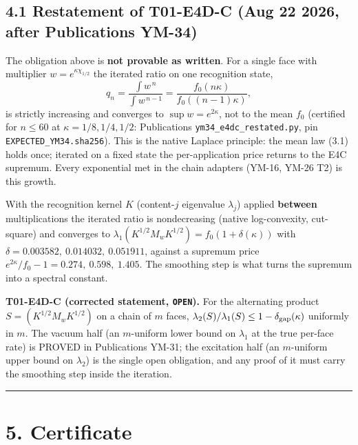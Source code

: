 \hypertarget{restatement-of-t01-e4d-c-aug-22-2026-after-publications-ym-34}{%
\subsection{4.1 Restatement of T01-E4D-C (Aug 22 2026, after Publications YM-34)}\label{restatement-of-t01-e4d-c-aug-22-2026-after-publications-ym-34}}

The obligation above is \textbf{not provable as written}. For a single face with
multiplier \(w=e^{\kappa\chi_{1/2}}\) the iterated ratio on one recognition
state,
\[
q_n=\frac{\int w^{\,n}}{\int w^{\,n-1}}=\frac{f_0(n\kappa)}{f_0((n-1)\kappa)},
\]
is strictly increasing and converges to \(\sup w=e^{2\kappa}\), not to the mean
\(f_0\) (certified for \(n\le 60\) at \(\kappa=1/8,1/4,1/2\): Publications
\texttt{ym34\_e4dc\_restated.py}, pin \texttt{EXPECTED\_YM34.sha256}). This is the native
Laplace principle: the mean law (3.1) holds once; iterated on a fixed state the
per-application price returns to the E4C supremum. Every exponential met in the
chain adapters (YM-16, YM-26 T2) is this growth.

With the recognition kernel \(K\) (content-\(j\) eigenvalue \(\lambda_j\)) applied
\textbf{between} multiplications the iterated ratio is nondecreasing (native
log-convexity, cut-square) and converges to
\(\lambda_1(K^{1/2}M_wK^{1/2})=f_0(1+\delta(\kappa))\) with
\(\delta=0.003582,\ 0.014032,\ 0.051911\), against a supremum price
\(e^{2\kappa}/f_0-1=0.274,\ 0.598,\ 1.405\). The smoothing step is what turns
the supremum into a spectral constant.

\textbf{T01-E4D-C (corrected statement, \texttt{OPEN}).} For the alternating product
\(S=(K^{1/2}M_wK^{1/2})\) on a chain of \(m\) faces,
\(\lambda_2(S)/\lambda_1(S)\le 1-\delta_{\rm gap}(\kappa)\) uniformly in \(m\).
The vacuum half (an \(m\)-uniform lower bound on \(\lambda_1\) at the true per-face
rate) is PROVED in Publications YM-31; the excitation half (an \(m\)-uniform upper
bound on \(\lambda_2\)) is the single open obligation, and any proof of it must
carry the smoothing step inside the iteration.

\begin{center}\rule{0.5\linewidth}{0.5pt}\end{center}

\hypertarget{certificate}{%
\section{5. Certificate}\label{certificate}}

